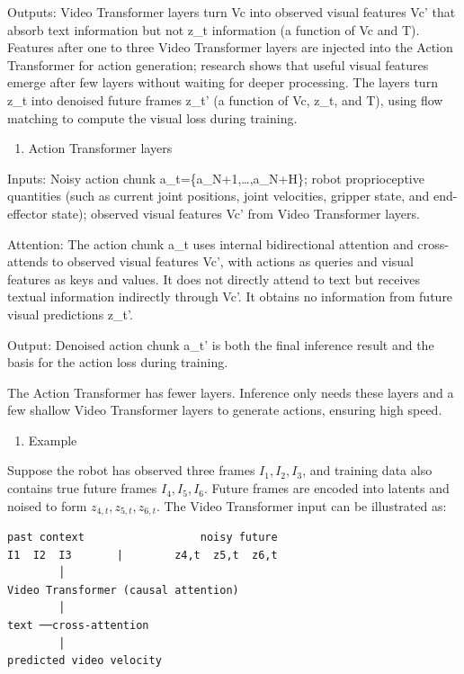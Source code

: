 Outputs: Video Transformer layers turn Vc into observed visual features Vc' that absorb text information but not z\_t information (a function of Vc and T). Features after one to three Video Transformer layers are injected into the Action Transformer for action generation; research shows that useful visual features emerge after few layers without waiting for deeper processing. The layers turn z\_t into denoised future frames z\_t' (a function of Vc, z\_t, and T), using flow matching to compute the visual loss during training.

\begin{enumerate}
\def\labelenumi{\arabic{enumi}.}
\setcounter{enumi}{1}
\tightlist
\item
  Action Transformer layers
\end{enumerate}

Inputs: Noisy action chunk a\_t=\{a\_N+1,\ldots,a\_N+H\}; robot proprioceptive quantities (such as current joint positions, joint velocities, gripper state, and end-effector state); observed visual features Vc' from Video Transformer layers.

Attention: The action chunk a\_t uses internal bidirectional attention and cross-attends to observed visual features Vc', with actions as queries and visual features as keys and values. It does not directly attend to text but receives textual information indirectly through Vc'. It obtains no information from future visual predictions z\_t'.

Output: Denoised action chunk a\_t' is both the final inference result and the basis for the action loss during training.

The Action Transformer has fewer layers. Inference only needs these layers and a few shallow Video Transformer layers to generate actions, ensuring high speed.

\begin{enumerate}
\def\labelenumi{\arabic{enumi}.}
\setcounter{enumi}{2}
\tightlist
\item
  Example
\end{enumerate}

Suppose the robot has observed three frames \(I_1,I_2,I_3\), and training data also contains true future frames \(I_4,I_5,I_6\). Future frames are encoded into latents and noised to form \(z_{4,t},z_{5,t},z_{6,t}\). The Video Transformer input can be illustrated as:

\begin{verbatim}
past context                  noisy future
I1  I2  I3       |        z4,t  z5,t  z6,t
        │
Video Transformer (causal attention)
        │
text ──cross-attention
        │
predicted video velocity
\end{verbatim}

